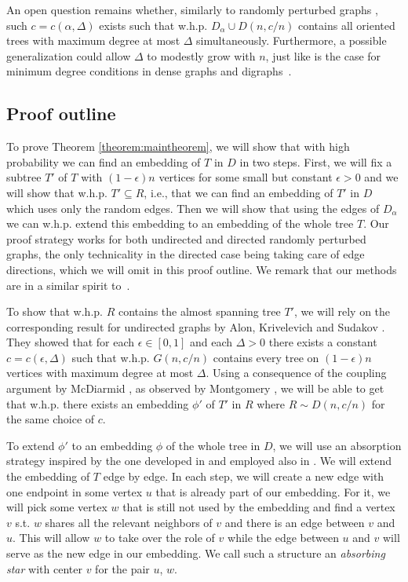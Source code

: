 \documentclass[10pt, a4paper]{article}
\theoremstyle{remark}
\begin{document}
An open question remains whether, similarly to randomly perturbed graphs \cite{undirected_spanning_universality}, such $c = c(\alpha, \Delta)$ exists such that w.h.p. $D_\alpha \cup D(n, c/n)$ contains all oriented trees with maximum degree at most $\Delta$ simultaneously. 
Furthermore, a possible generalization could allow $\Delta$ to modestly grow with $n$, just like is the case for minimum degree conditions in dense graphs and digraphs~\cite{kathapurkar22,kss2001}.

\subsection*{Proof outline}

To prove Theorem \ref{theorem:maintheorem}, we will show that with high probability we can find an embedding of $T$ in $D$ in two steps.
First, we will fix a subtree $T'$ of $T$ with $(1-\epsilon)n$ vertices for some small but constant $\epsilon > 0$ and we will show that w.h.p. $T' \subseteq R$, i.e., that we can find an embedding of $T'$ in $D$ which uses only the random edges.
Then we will show that using the edges of $D_\alpha$ we can w.h.p. extend this embedding to an embedding of the whole tree $T$.
Our proof strategy works for both undirected and directed randomly perturbed graphs, the only technicality in the directed case being taking care of edge directions, which we will omit in this proof outline. We remark that our methods are in a similar spirit to~\cite{bottcher2020embedding,undirected_spanning_universality}.

To show that w.h.p. $R$ contains the almost spanning tree $T'$, we will rely on the corresponding result for undirected graphs by Alon, Krivelevich and Sudakov \cite[Theorem 1.1]{alon_embedding_2007}. 
They showed that for each $\epsilon \in [0,1]$ and each $\Delta >0$ there exists a constant $c = c(\epsilon, \Delta)$ such that w.h.p. $G(n, c/n)$ contains every tree on $(1-\epsilon)n$ vertices with maximum degree at most $\Delta$.
Using a consequence of the coupling argument by McDiarmid \cite{mcdiarmid_general_1983}, as observed by Montgomery \cite{montgomery_spanning_2021}, we will be able to get that w.h.p.  there exists an embedding $\phi'$ of $T'$ in $ R$ where $R \sim D(n, c/n)$ for the same choice of $c$.

To extend $\phi'$ to an embedding $\phi$ of the whole tree in $D$, we will use an absorption strategy inspired by the one developed in \cite{bottcher2020embedding} and employed also in \cite{undirected_spanning_universality,pavez-signe_dirac-type_2021,pehova2023minimum}.
We will extend the embedding of $T$ edge by edge.
In each step, we will create a new edge with one endpoint in some vertex $u$ that is already part of our embedding.
For it, we will pick some vertex $w$ that is still not used by the embedding and find a vertex $v$ s.t. $w$ shares all the relevant neighbors of $v$ and there is an edge between $v$ and $u$.
This will allow $w$ to take over the role of $v$ while the edge between $u$ and $v$ will serve as the new edge in our embedding.
We call such a structure an \emph{absorbing star} with center $v$ for the pair $u$, $w$.
\end{document}
